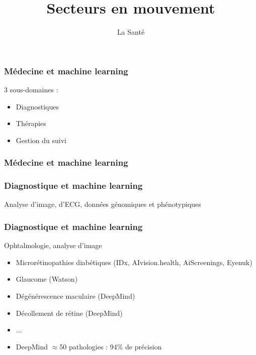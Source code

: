 \documentclass{formation}
\title{Secteurs en mouvement}
\subtitle{La Santé}
\begin{document}
\maketitle

\begin{frame}
  \frametitle{Médecine et machine learning}
  3 sous-domaines :
  \begin{itemize}
  \item Diagnostiques
  \item Thérapies
  \item Gestion du suivi
  \end{itemize}
\end{frame}

\begin{frame}
  \frametitle{Médecine et machine learning}
\end{frame}

\begin{frame}
  \frametitle{Diagnostique et machine learning}
  Analyse d'image, d'ECG, données génomiques et phénotypiques
\end{frame}

\begin{frame}
  \frametitle{Diagnostique et machine learning}
  Ophtalmologie, analyse d'image
  \newline
  \newline
  \begin{minipage}[c]{0.65\linewidth}
    \begin{itemize}
    \item Microrétinopathies diabétiques (IDx, AIvision.health, AiScreenings, Eyenuk)
    \item Glaucome (Watson)
    \item Dégénérescence maculaire (DeepMind)
    \item Décollement de rétine (DeepMind)
    \item ...
    \item DeepMind $\approx$50 pathologies : 94\% de précision
    \end{itemize}
  \end{minipage}\hfill
  \begin{minipage}[c]{0.34\linewidth}
  \end{minipage}\hfill
\end{frame}
\end{document}
